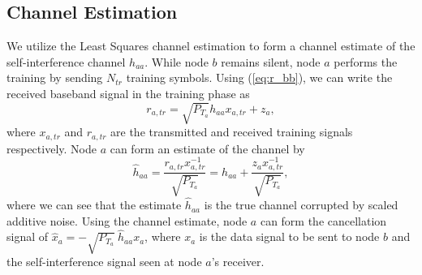 \documentclass[12pt, journal,draftcls,letterpaper,onecolumn]{IEEEtran}
\begin{document}
\subsection{Channel Estimation}
We utilize the Least Squares channel estimation to form a channel estimate of the self-interference channel $h_{aa}$.  While node $b$ remains silent, node $a$ performs the training by sending $N_{tr}$ training symbols.  Using (\ref{eq:r_bb}), we can write the received baseband signal in the training phase as
\begin{equation}
r_{a,tr} = \sqrt{P_{T_a}}h_{aa} x_{a,tr} + z_a,
\label{eq:r_train}
\end{equation}
where $x_{a,tr}$ and $r_{a,tr}$ are the transmitted and received training signals respectively.  Node $a$ can form an estimate of the channel by 
\begin{equation}
\widehat{h}_{aa} = \dfrac{r_{a,tr}x_{a,tr}^{-1}}{\sqrt{P_{T_a}}} = h_{aa} + \dfrac{z_a x_{a,tr}^{-1}}{\sqrt{P_{T_a}}},
\end{equation}
where we can see that the estimate $\widehat{h}_{aa}$ is the true channel corrupted by scaled additive noise.  Using the channel estimate, node $a$ can form the cancellation signal of $\widehat{x}_a = -\sqrt{P_{T_a}} \: \widehat{h}_{aa} x_a$, where $x_a$ is the data signal to be sent to node $b$ and the self-interference signal seen at node $a$'s receiver. 
\end{document}
